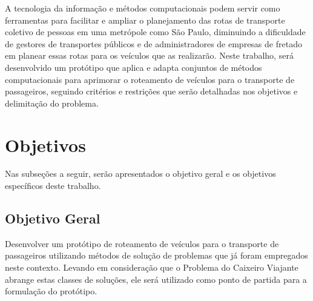 A tecnologia da informação e métodos computacionais podem servir como ferramentas para facilitar e ampliar o planejamento das rotas de transporte coletivo de pessoas em uma metrópole como São Paulo, diminuindo a dificuldade de gestores de transportes públicos e de administradores de empresas de fretado em planear essas rotas para os veículos que as realizarão. Neste trabalho, será desenvolvido um protótipo que aplica e adapta conjuntos de métodos computacionais para aprimorar o roteamento de veículos para o transporte de passageiros, seguindo critérios e restrições que serão detalhadas nos objetivos e delimitação do problema.

\section{Objetivos}

Nas subseções a seguir, serão apresentados o objetivo geral e os objetivos específicos deste trabalho. 

\subsection{Objetivo Geral}

Desenvolver um protótipo de roteamento de veículos para o transporte de passageiros utilizando métodos de solução de problemas que já foram empregados neste contexto. Levando em consideração que o Problema do Caixeiro Viajante abrange estas classes de soluções, ele será utilizado como ponto de partida para a formulação do protótipo.

